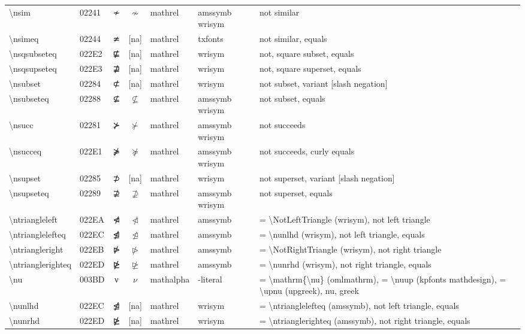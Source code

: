 \documentclass[a4paper,landscape]{article}
\begin{document}
\begin{longtable}{llcclll}
\textbackslash{}nsim & 02241 & ≁ & $\nsim$ & mathrel & amssymb wrisym & not similar \\
\textbackslash{}nsimeq & 02244 & ≄ & [na] & mathrel & txfonts & not similar, equals \\
\textbackslash{}nsqsubseteq & 022E2 & ⋢ & [na] & mathrel & wrisym & not, square subset, equals \\
\textbackslash{}nsqsupseteq & 022E3 & ⋣ & [na] & mathrel & wrisym & not, square superset, equals \\
\textbackslash{}nsubset & 02284 & ⊄ & [na] & mathrel & wrisym & not subset, variant [slash negation] \\
\textbackslash{}nsubseteq & 02288 & ⊈ & $\nsubseteq$ & mathrel & amssymb wrisym & not subset, equals \\
\textbackslash{}nsucc & 02281 & ⊁ & $\nsucc$ & mathrel & amssymb wrisym & not succeeds \\
\textbackslash{}nsucceq & 022E1 & ⋡ & $\nsucceq$ & mathrel & amssymb wrisym & not succeeds, curly equals \\
\textbackslash{}nsupset & 02285 & ⊅ & [na] & mathrel & wrisym & not superset, variant [slash negation] \\
\textbackslash{}nsupseteq & 02289 & ⊉ & $\nsupseteq$ & mathrel & amssymb wrisym & not superset, equals \\
\textbackslash{}ntriangleleft & 022EA & ⋪ & $\ntriangleleft$ & mathrel & amssymb & = \textbackslash{}NotLeftTriangle (wrisym), not left triangle \\
\textbackslash{}ntrianglelefteq & 022EC & ⋬ & $\ntrianglelefteq$ & mathrel & amssymb & = \textbackslash{}nunlhd (wrisym), not left triangle, equals \\
\textbackslash{}ntriangleright & 022EB & ⋫ & $\ntriangleright$ & mathrel & amssymb & = \textbackslash{}NotRightTriangle (wrisym), not right triangle \\
\textbackslash{}ntrianglerighteq & 022ED & ⋭ & $\ntrianglerighteq$ & mathrel & amssymb & = \textbackslash{}nunrhd (wrisym), not right triangle, equals \\
\textbackslash{}nu & 003BD & ν & $\nu$ & mathalpha & -literal & = \textbackslash{}mathrm\{\textbackslash{}nu\} (omlmathrm), = \textbackslash{}nuup (kpfonts mathdesign), = \textbackslash{}upnu (upgreek), nu, greek \\
\textbackslash{}nunlhd & 022EC & ⋬ & [na] & mathrel & wrisym & = \textbackslash{}ntrianglelefteq (amssymb),  not left triangle,  equals \\
\textbackslash{}nunrhd & 022ED & ⋭ & [na] & mathrel & wrisym & = \textbackslash{}ntrianglerighteq (amssymb),  not right triangle,  equals \\

\end{longtable}
\end{document}

